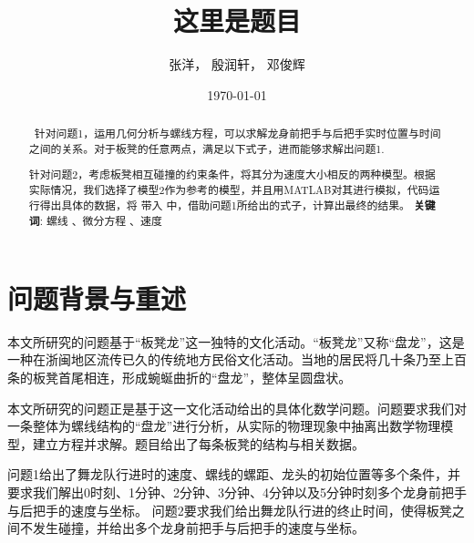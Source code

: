 \documentclass[10pt, a4paper, oneside]{ctexart}
\title{\textbf{这里是题目}}
\author{张洋， 殷润轩， 邓俊辉}
\date{\today}
\begin{document}
\maketitle
\setcounter{page}{0}
\thispagestyle{empty}
\begin{abstract}
	{\fontsize{10}{15}\selectfont\
        针对问题1，运用几何分析与螺线方程，可以求解龙身前把手与后把手实时位置与时间之间的关系。对于板凳的任意两点，满足以下式子，进而能够求解出问题1.\par
        针对问题2，考虑板凳相互碰撞的约束条件，将其分为速度大小相反的两种模型。根据实际情况，我们选择了模型2作为参考的模型，并且用MATLAB对其进行模拟，代码运行得出具体的数据，将  带入   中，借助问题1所给出的式子，计算出最终的结果。
	\textbf{关键词}:
	\space 螺线 、微分方程 、速度\newpage}
\end{abstract}
\pagestyle{fancy}
\fancyhf{}
\fancyheadoffset{0cm}
\fancyfoot[C]{\thepage}
\section{问题背景与重述}
本文所研究的问题基于“板凳龙”这一独特的文化活动。“板凳龙”又称“盘龙”，这是一种在浙闽地区流传已久的传统地方民俗文化活动。当地的居民将几十条乃至上百条的板凳首尾相连，形成蜿蜒曲折的“盘龙”，整体呈圆盘状。\par
本文所研究的问题正是基于这一文化活动给出的具体化数学问题。问题要求我们对一条整体为螺线结构的“盘龙”进行分析，从实际的物理现象中抽离出数学物理模型，建立方程并求解。题目给出了每条板凳的结构与相关数据。\par
问题1给出了舞龙队行进时的速度、螺线的螺距、龙头的初始位置等多个条件，并要求我们解出0时刻、1分钟、2分钟、3分钟、4分钟以及5分钟时刻多个龙身前把手与后把手的速度与坐标。
问题2要求我们给出舞龙队行进的终止时间，使得板凳之间不发生碰撞，并给出多个龙身前把手与后把手的速度与坐标。
\end{document}
